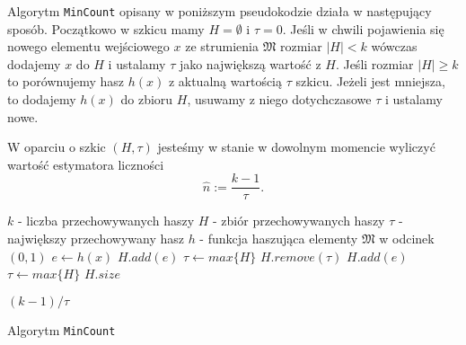 Algorytm \texttt{MinCount} opisany w poniższym pseudokodzie działa w następujący sposób.
Początkowo w szkicu mamy $H = \emptyset$ i $\tau = 0$.
Jeśli w chwili pojawienia się nowego elementu wejściowego $x$
 ze strumienia $\mathfrak{M}$ rozmiar $|H|< k$ wówczas dodajemy $x$ do $H$ i ustalamy $\tau$ jako największą wartość z $H$.
 Jeśli rozmiar $|H|\geq k$ to porównujemy hasz $h(x)$ z aktualną wartością  ${\tau}$ szkicu. Jeżeli jest mniejsza, to dodajemy $h(x)$ do zbioru $H$, usuwamy z niego dotychczasowe ${\tau}$ i ustalamy nowe.

W oparciu o szkic $(H, {\tau})$ jesteśmy w stanie w dowolnym momencie wyliczyć wartość estymatora liczności $$\hat{n} := \frac{k - 1}{{\tau}}.$$

\begin{algorithm}
    \begin{algorithmic}
    \State $k$ -  liczba przechowywanych haszy 
    \State $H  $ - zbiór przechowywanych haszy
    \State $\tau  $ - największy przechowywany hasz 
    \State $h  $ - funkcja haszująca elementy $\mathfrak{M}$ w odcinek $(0, 1)$
    \newline
        \State $e \gets h(x)$
                \State $H.add(e)$
                \State $\tau \gets max\{H\}$
                \State $H.remove(\tau)$
                \State $H.add(e)$
                \State $\tau \gets max\{H\}$
            \EndIf
        \EndIf
    \EndFunction
    \newline
            \State \Return $H.size$
        
        \Else 
            \State \Return $(k - 1) / \tau$
        \EndIf
    \EndFunction
    
    \end{algorithmic}
    \caption{Algorytm \texttt{MinCount}}
\end{algorithm}


